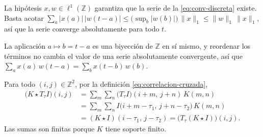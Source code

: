 \begin{observacion}\label{obs:conv-L1}
La hipótesis $x, w \in \ell^1(\mathbb{Z})$ garantiza que la serie de la
\cref{eq:conv-discreta} existe. Basta acotar
$\sum_a |x(a)|\,|w(t-a)| \le \bigl(\sup_b |w(b)|\bigr)\,\|x\|_1 \le \|w\|_1\,\|x\|_1$,
así que la serie converge absolutamente para todo $t$.
\end{observacion}

\begin{demostracion}
La aplicación $a \mapsto b = t - a$ es una biyección de $\mathbb{Z}$ en
sí mismo, y reordenar los términos no cambia el valor de una serie
absolutamente convergente, así que
$\sum_{a} x(a)\,w(t-a) = \sum_{b} x(t-b)\,w(b)$.
\end{demostracion}

\begin{demostracion}
Para todo $(i,j) \in \mathbb{Z}^2$, por la definición
\cref{eq:correlacion-cruzada},
\begin{align*}
  \bigl(K \star T_\tau I\bigr)(i,j)
  &= \sum_{m}\sum_{n} \bigl(T_\tau I\bigr)(i+m,\, j+n)\, K(m,n)\\
  &= \sum_{m}\sum_{n} I\bigl(i+m-\tau_1,\, j+n-\tau_2\bigr)\, K(m,n)\\
  &= (K \star I)(i-\tau_1,\, j-\tau_2)
  = \bigl(T_\tau(K \star I)\bigr)(i,j).
\end{align*}
Las sumas son finitas porque $K$ tiene soporte finito.
\end{demostracion}

